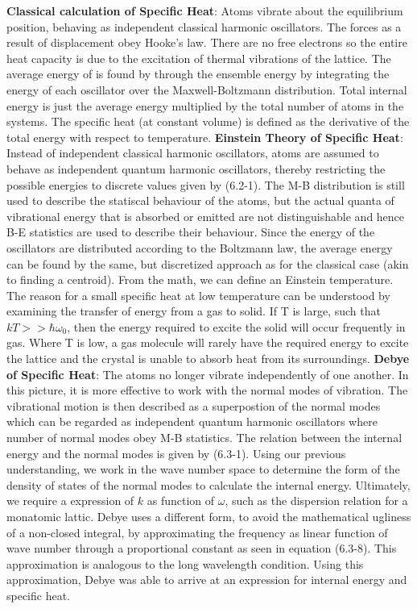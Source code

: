 \documentclass{article}
\numberwithin{equation}{section}
\begin{document}
\textbf{Classical calculation of Specific Heat}: Atoms vibrate about the equilibrium position, behaving as independent classical harmonic oscillators. The forces as a result of displacement obey Hooke's law. There are no free electrons so the entire heat capacity is due to the excitation of thermal vibrations of the lattice. The average energy of is found by through the ensemble energy by integrating the energy of each oscillator over the Maxwell-Boltzmann distribution. Total internal energy is just the average energy multiplied by the total number of atoms in the systems. The specific heat (at constant volume) is defined as the derivative of the total energy with respect to temperature. 
\newline
\textbf{Einstein Theory of Specific Heat}: Instead of independent classical harmonic oscillators, atoms are assumed to behave as independent quantum harmonic oscillators, thereby restricting the possible energies to discrete values given by (6.2-1). The M-B distribution is still used to describe the statiscal behaviour of the atoms, but the actual quanta of vibrational energy that is absorbed or emitted are not distinguishable and hence B-E statistics are used to describe their behaviour. Since the energy of the oscillators are distributed according to the Boltzmann law, the average energy can be found by the same, but discretized approach as for the classical case (akin to finding a centroid). From the math, we can define an Einstein temperature. The reason for a small specific heat at low temperature can be understood by examining the transfer of energy from a gas to solid. If T is large, such that $kT>>\hbar\omega_0$, then the energy required to excite the solid will occur frequently in gas. Where T is low, a gas molecule will rarely have the required energy to excite the lattice and the crystal is unable to absorb heat from its surroundings.
\newline
\textbf{Debye of Specific Heat}: The atoms no longer vibrate independently of one another. In this picture, it is more effective to work with the normal modes of vibration. The vibrational motion is then described as a superpostion of the normal modes which can be regarded as independent quantum harmonic oscillators where number of normal modes obey M-B statistics. The relation between the internal energy and the normal modes is given by (6.3-1). Using our previous understanding, we work in the wave number space to determine the form of the density of states of the normal modes to calculate the internal energy. Ultimately, we require a expression of $k$ as function of $\omega$, such as the dispersion relation for a monatomic lattic. Debye uses a different form, to avoid the mathematical ugliness of a non-closed integral, by approximating the frequency as linear function of wave number through a proportional constant as seen in equation (6.3-8). This approximation is analogous to the long wavelength condition. Using this approximation, Debye was able to arrive at an expression for internal energy and specific heat.
\end{document}
